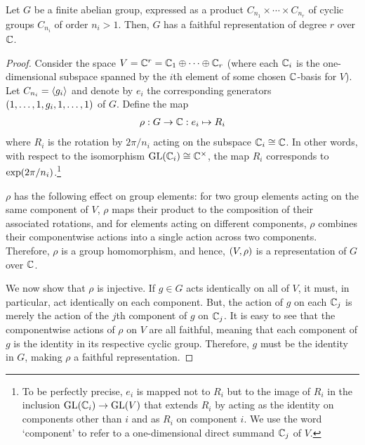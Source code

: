 \begin{lemma}
    Let $G$ be a finite abelian group, expressed as a product $C_{n_1} \times \cdots \times C_{n_r}$ of cyclic groups $C_{n_i}$ of order $n_i > 1$. Then, $G$ has a faithful representation of degree $r$ over $\mathbb{C}$.
\end{lemma}
\begin{proof}
    Consider the space $V = \mathbb{C}^r = \mathbb{C}_1 \oplus \cdots \oplus \mathbb{C}_r$ (where each $\mathbb{C}_i$ is the one-dimensional subspace spanned by the $i$th element of some chosen $\mathbb{C}$-basis for $V$). Let $C_{n_i} = \left\langle g_i \right\rangle$ and denote by $e_i$ the corresponding generators $\left( 1, \ldots, 1, g_i, 1, \ldots, 1 \right)$ of $G$. Define the map
    \begin{align}
        \rho : G \to \mathbb{C} : e_i \mapsto R_{i}
    \end{align}
    where $R_i$ is the rotation by $2\pi / n_i$ acting on the subspace $\mathbb{C}_i \cong \mathbb{C}$. In other words, with respect to the isomorphism $\operatorname{GL}\!\left( \mathbb{C}_i \right) \cong \mathbb{C}^{\times}$, the map $R_i$ corresponds to $\exp\!\left( {2\pi}/{n_i} \right)$.\footnote{To be perfectly precise, $e_i$ is mapped not to $R_i$ but to the image of $R_i$ in the inclusion $\operatorname{GL}\!\left( \mathbb{C}_i \right) \to \operatorname{GL}\!\left( V \right)$ that extends $R_i$ by acting as the identity on components other than $i$ and as $R_i$ on component $i$. We use the word `component' to refer to a one-dimensional direct summand $\mathbb{C}_j$ of $V$.}

    $\rho$ has the following effect on group elements: for two group elements acting on the same component of $V$, $\rho$ maps their product to the composition of their associated rotations, and for elements acting on different components, $\rho$ combines their componentwise actions into a single action across two components. Therefore, $\rho$ is a group homomorphism, and hence, $\left( V, \rho \right)$ is a representation of $G$ over $\mathbb{C}$.

    We now show that $\rho$ is injective. If $g \in G$ acts identically on all of $V$, it must, in particular, act identically on each component. But, the action of $g$ on each $\mathbb{C}_j$ is merely the action of the $j$th component of $g$ on $\mathbb{C}_j$. It is easy to see that the componentwise actions of $\rho$ on $V$ are all faithful, meaning that each component of $g$ is the identity in its respective cyclic group. Therefore, $g$ must be the identity in $G$, making $\rho$ a faithful representation.
\end{proof}
